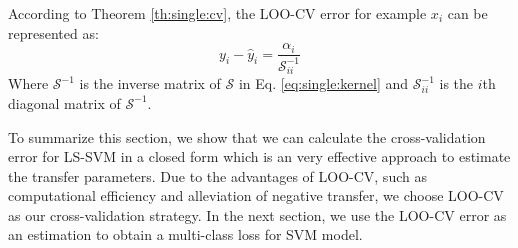According to Theorem \ref{th:single:cv}, the LOO-CV error for example $x_i$ can be represented as:
\begin{equation}\label{eq:single:looesti}
	y_i-\hat{y}_i=\frac{\alpha_i}{\mathcal{S}^{-1}_{ii}}
\end{equation}
Where $\mathcal{S}^{-1}$ is the inverse matrix of $\mathcal{S}$ in Eq. \eqref{eq:single:kernel} and $\mathcal{S}^{-1}_{ii}$ is the $i$th diagonal matrix of $\mathcal{S}^{-1}$. 

To summarize this section, we show that we can calculate the cross-validation error for LS-SVM in a closed form which is an very effective approach to estimate the transfer parameters. Due to the advantages of LOO-CV, such as computational efficiency and alleviation of negative transfer, we choose LOO-CV as our cross-validation strategy. In the next section, we use the LOO-CV error as an estimation to obtain a multi-class loss for SVM model. 